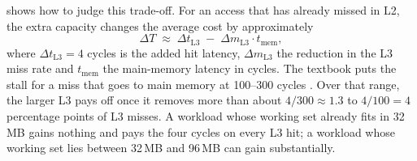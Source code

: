  shows how to judge this trade-off. For an access that has already missed in L2, the extra capacity changes the average cost by approximately
\begin{equation}
  \Delta T \;\approx\; \Delta t_{\mathrm{L3}} \;-\; \Delta m_{\mathrm{L3}} \cdot t_{\mathrm{mem}},
  \label{eq:vcache-tradeoff}
\end{equation}
where $\Delta t_{\mathrm{L3}} = 4$ cycles is the added hit latency, $\Delta m_{\mathrm{L3}}$ the reduction in the L3 miss rate and $t_{\mathrm{mem}}$ the main-memory latency in cycles. The textbook puts the stall for a miss that goes to main memory at 100--300 cycles \cite[sec.~12.4.8]{sarangi2025basic}. Over that range, the larger L3 pays off once it removes more than about $4/300 \approx 1.3$ to $4/100 = 4$ percentage points of L3 misses. A workload whose working set already fits in 32\,MB gains nothing and pays the four cycles on every L3 hit; a workload whose working set lies between 32\,MB and 96\,MB can gain substantially.

